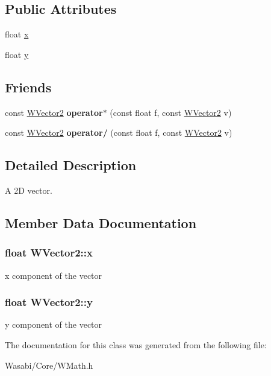 \subsection*{Public Attributes}
\begin{DoxyCompactItemize}
\item 
float \hyperlink{class_w_vector2_a4fbab0c9449635b7407ea115abdb23b1}{x}
\item 
float \hyperlink{class_w_vector2_aa33b2c100fa7d2292b4ae869043ba0fc}{y}
\end{DoxyCompactItemize}
\subsection*{Friends}
\begin{DoxyCompactItemize}
\item 
const \hyperlink{class_w_vector2}{W\+Vector2} {\bfseries operator$\ast$} (const float f, const \hyperlink{class_w_vector2}{W\+Vector2} v)\hypertarget{class_w_vector2_acf66bca00d9998440e3392857f234eb5}{}\label{class_w_vector2_acf66bca00d9998440e3392857f234eb5}

\item 
const \hyperlink{class_w_vector2}{W\+Vector2} {\bfseries operator/} (const float f, const \hyperlink{class_w_vector2}{W\+Vector2} v)\hypertarget{class_w_vector2_a37536532e8fd992c39f0b48077e5c10c}{}\label{class_w_vector2_a37536532e8fd992c39f0b48077e5c10c}

\end{DoxyCompactItemize}


\subsection{Detailed Description}
A 2D vector. 

\subsection{Member Data Documentation}
\subsubsection[{\texorpdfstring{x}{x}}]{\setlength{\rightskip}{0pt plus 5cm}float W\+Vector2\+::x}\hypertarget{class_w_vector2_a4fbab0c9449635b7407ea115abdb23b1}{}\label{class_w_vector2_a4fbab0c9449635b7407ea115abdb23b1}
x component of the vector 
\subsubsection[{\texorpdfstring{y}{y}}]{\setlength{\rightskip}{0pt plus 5cm}float W\+Vector2\+::y}\hypertarget{class_w_vector2_aa33b2c100fa7d2292b4ae869043ba0fc}{}\label{class_w_vector2_aa33b2c100fa7d2292b4ae869043ba0fc}
y component of the vector 

The documentation for this class was generated from the following file\+:\begin{DoxyCompactItemize}
\item 
Wasabi/\+Core/W\+Math.\+h\end{DoxyCompactItemize}
